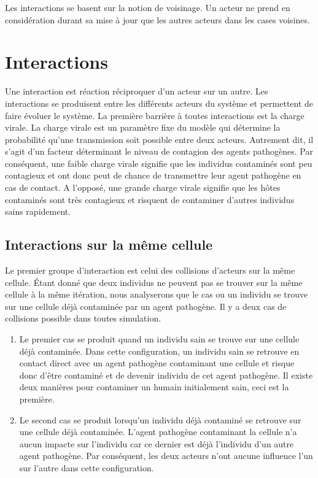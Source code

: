 Les interactions se basent sur la notion de voisinage. Un acteur ne prend en considération durant sa mise à jour que les autres acteurs dans les cases voisines.

\section{Interactions}

Une interaction est réaction réciproquer d'un acteur sur un autre. Les interactions se produisent entre les différents acteurs du système et permettent de faire évoluer le système. La première barrière à toutes interactions est la charge virale. La charge virale est un paramètre fixe du modèle qui détermine la probabilité qu'une transmission soit possible entre deux acteurs. Autrement dit, il s'agit d'un facteur déterminant le niveau de contagion des agents pathogènes. Par conséquent, une faible charge virale signifie que les individus contaminés sont peu contagieux et ont donc peut de chance de transmettre leur agent pathogène en cas de contact. A l'opposé, une grande charge virale signifie que les hôtes contaminés sont très contagieux et risquent de contaminer d'autres individus sains rapidement.\\

\subsection{Interactions sur la même cellule}

Le premier groupe d'interaction est celui des collisions d'acteurs sur la même cellule. Étant donné que deux individus ne peuvent pas se trouver sur la même cellule à la même itération, nous analyserons que le cas ou un individu se trouve sur une cellule déjà contaminée par un agent pathogène. Il y a deux cas de collisions possible dans toutes simulation.

\begin{enumerate}
	\item Le premier cas se produit quand un individu sain se trouve sur une cellule déjà contaminée. Dans cette configuration, un individu sain se retrouve en contact direct avec un agent pathogène contaminant une cellule et risque donc d'être contaminé et de devenir individu de cet agent pathogène. Il existe deux manières pour contaminer un humain initialement sain, ceci est la première.
	\item Le second cas se produit lorsqu'un individu déjà contaminé se retrouve sur une cellule déjà contaminée. L'agent pathogène contaminant la cellule n'a aucun impacte sur l'individu car ce dernier est déjà l'individu d'un autre agent pathogène. Par conséquent, les deux acteurs n'ont aucune influence l'un sur l'autre dans cette configuration.
\end{enumerate}

